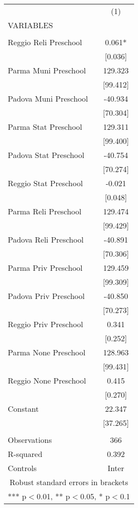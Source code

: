 \begin{tabular}{lc} \hline
 & (1) \\
VARIABLES &  \\ \hline
 &  \\
Reggio Reli Preschool & 0.061* \\
 & [0.036] \\
Parma Muni Preschool & 129.323 \\
 & [99.412] \\
Padova Muni Preschool & -40.934 \\
 & [70.304] \\
Parma Stat Preschool & 129.311 \\
 & [99.400] \\
Padova Stat Preschool & -40.754 \\
 & [70.274] \\
Reggio Stat Preschool & -0.021 \\
 & [0.048] \\
Parma Reli Preschool & 129.474 \\
 & [99.429] \\
Padova Reli Preschool & -40.891 \\
 & [70.306] \\
Parma Priv Preschool & 129.459 \\
 & [99.309] \\
Padova Priv Preschool & -40.850 \\
 & [70.273] \\
Reggio Priv Preschool & 0.341 \\
 & [0.252] \\
Parma None Preschool & 128.963 \\
 & [99.431] \\
Reggio None Preschool & 0.415 \\
 & [0.270] \\
Constant & 22.347 \\
 & [37.265] \\
 &  \\
Observations & 366 \\
R-squared & 0.392 \\
 Controls & Inter \\ \hline
\multicolumn{2}{c}{ Robust standard errors in brackets} \\
\multicolumn{2}{c}{ *** p$<$0.01, ** p$<$0.05, * p$<$0.1} \\
\end{tabular}
